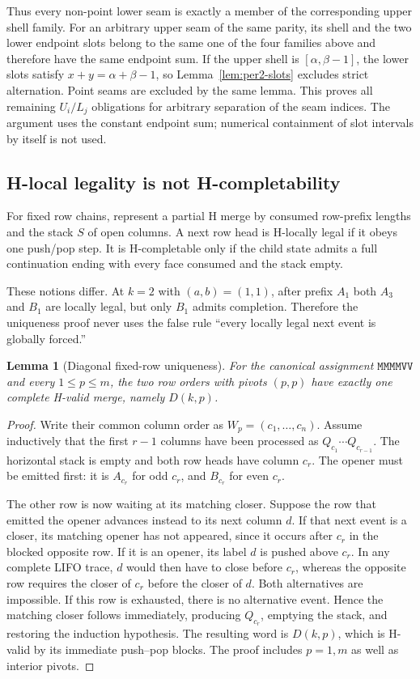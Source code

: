 \documentclass[11pt]{article}
\newtheorem{lemma}[theorem]{Lemma}
\theoremstyle{definition}
\theoremstyle{remark}
\begin{document}
Thus every non-point lower seam is exactly a member of the corresponding
upper shell family. For an arbitrary upper seam of the same parity, its
shell and the two lower endpoint slots belong to the same one of the four
families above and therefore have the same endpoint sum. If the upper
shell is $[\alpha,\beta-1]$, the lower slots satisfy
$x+y=\alpha+\beta-1$, so Lemma~\ref{lem:per2-slots} excludes strict
alternation. Point seams are excluded by the same lemma. This proves all
remaining $U_i/L_j$ obligations for arbitrary separation of the seam
indices. The argument uses the constant endpoint sum; numerical
containment of slot intervals by itself is not used.

\subsection{H-local legality is not
H-completability}\label{d.6.-h-local-legality-is-not-h-completability}

For fixed row chains, represent a partial H merge by consumed row-prefix
lengths and the stack \(S\) of open columns. A next row head is
H-locally legal if it obeys one push/pop step. It is H-completable only
if the child state admits a full continuation ending with every face
consumed and the stack empty.

These notions differ. At \(k=2\) with \((a,b)=(1,1)\), after prefix
\(A_1\) both \(A_3\) and \(B_1\) are locally legal, but only \(B_1\)
admits completion. Therefore the uniqueness proof never uses the false
rule ``every locally legal next event is globally forced.''

\begin{lemma}[Diagonal fixed-row uniqueness]\label{lem:per2-diagonal}
For the canonical assignment $\texttt{MMMMVV}$ and every
$1\le p\le m$, the two row orders with pivots $(p,p)$ have exactly one
complete H-valid merge, namely $D(k,p)$.
\end{lemma}
\begin{proof}
Write their common column order as $W_p=(c_1,\ldots,c_n)$.
Assume inductively that the first $r-1$ columns have been processed as
$Q_{c_1}\cdots Q_{c_{r-1}}$. The horizontal stack is empty and both row
heads have column $c_r$. The opener must be emitted first: it is
$A_{c_r}$ for odd $c_r$, and $B_{c_r}$ for even $c_r$.

The other row is now waiting at its matching closer. Suppose the row
that emitted the opener advances instead to its next column $d$.
If that next event is a closer, its matching opener has not appeared,
since it occurs after $c_r$ in the blocked opposite row. If it is an
opener, its label $d$ is pushed above $c_r$. In any complete LIFO trace,
$d$ would then have to close before $c_r$, whereas the opposite row
requires the closer of $c_r$ before the closer of $d$. Both alternatives
are impossible. If this row is exhausted, there is no alternative event.
Hence the matching closer follows immediately, producing $Q_{c_r}$,
emptying the stack, and restoring the induction hypothesis.
The resulting word is $D(k,p)$, which is H-valid by its immediate
push--pop blocks. The proof includes $p=1,m$ as well as interior pivots.
\end{proof}
\end{document}
